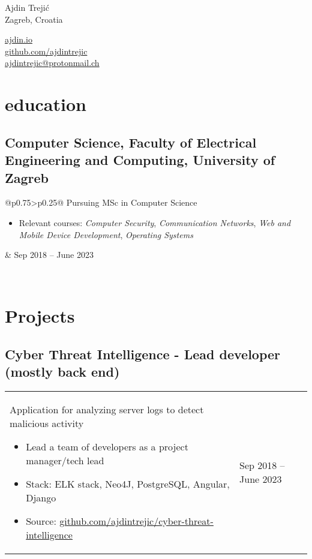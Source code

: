 \documentclass[a4paper]{article}
\makeatletter
\newlength{\tablewidth}
\newenvironment{period}[2]{%
\newcommand{\sarma}{#2}%
\setlength{\tablewidth}{\linewidth}
\addtolength{\tablewidth}{-2\tabcolsep}
\begin{tabular}{@{}p{0.75\tablewidth}>{\raggedleft\arraybackslash}p{0.25\tablewidth}@{}}%
#1 \newline
\begin{itemize}
}{%
\end{itemize} & \sarma \\%
\end{tabular}\\
}
\makeatother
\begin{document}
\fontfamily{\sfdefault}
\selectfont

\begin{minipage}{.5\textwidth}
\LARGE{Ajdin Trejić}\\
\normalsize{Zagreb, Croatia}
\end{minipage}%
\begin{minipage}{.5\textwidth}
\raggedleft
\href{https://ajdin.io}{ajdin.io} \\
\href{https://github.com/ajdintrejic}{github.com/ajdintrejic} \\
\href{mailto:ajdintrejic@protonmail.ch}{ajdintrejic@protonmail.ch} 
\end{minipage}

\vspace{1em}

\section{education}

\subsection{Computer Science, Faculty of Electrical Engineering and Computing,  University of Zagreb}
\begin{period}{Pursuing MSc in Computer Science}{Sep 2018 -- June 2023\linebreak}
    \item Relevant courses:
        \textit{Computer Security},
        \textit{Communication Networks},
        \textit{Web and Mobile Device Development},
        \textit{Operating Systems}
\end{period}



\iffalse
\begin{period}{BSc in Computer Science}{Sep 2008 -- Jul 2011}
    \item thesis:
        \textit{GPU implementation of a space and time optimal parallel sequence alignment algorithm}
    \item completed optional course \textit{Competitive programming} (rank 3/40)
\end{period}
\fi

\section{Projects}

\subsection{Cyber Threat Intelligence - Lead developer (mostly back end)}
\begin{period}{Application for analyzing server logs to detect malicious activity}{Sept 2020 -- May 2020}
\item Lead a team of developers as a project manager/tech lead
\item Stack: ELK stack, Neo4J, PostgreSQL, Angular, Django
\item Source: \href{https://github.com/ajdintrejic/cyber-threat-intelligence}{github.com/ajdintrejic/cyber-threat-intelligence}
\end{period}
\end{document}
